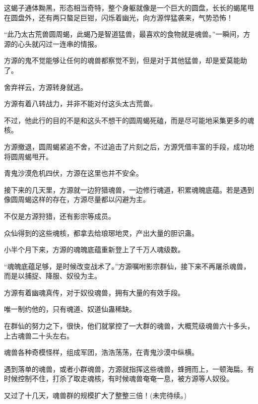 \begin{this_body}
这蝎子通体黝黑，形态相当奇特，整个身躯就像是一个巨大的圆盘，长长的蝎尾甩在圆盘外，还有两只螯足巨钳，闪烁着幽光，向方源悍猛袭来，气势恐怖！

“此乃太古荒兽圆周蝎，此蝎乃是智道猛兽，最喜欢的食物就是魂兽。”一瞬间，方源的心头就闪过一连串的情报。

方源的鬼不觉能够让任何的魂兽都察觉不到，但是对于其他猛兽，却是爱莫能助了。

舍弃祥云，方源转身就逃。

方源有着八转战力，并非不能对付这头太古荒兽。

不过，他此行的目的不是和这头不想干的圆周蝎死磕，而是尽可能地采集更多的魂核。

方源撤退，圆周蝎紧追不舍，不过追击了片刻之后，方源凭借丰富的手段，成功地将圆周蝎甩开。

青鬼沙漠危机四伏，方源在这里也并不安全。

接下来的几天里，方源就一边狩猎魂兽，一边修行魂道，积累魂魄底蕴。若是遇到像圆周蝎这样的存在，方源尽量都以闪避为主。

不仅是方源狩猎，还有影宗等成员。

众仙得到的这些魂核，都拿去给琅琊地灵，产出大量的胆识蛊。

小半个月下来，方源的魂魄底蕴重新登上了千万人魂级数。

“魂魄底蕴足够，是时候改变战术了。”方源嘱咐影宗群仙，接下来不再屠杀魂兽，而是以捕捉、降服、奴役为主。

方源有着幽魂真传，对于奴役魂兽，拥有大量的有效手段。

唯一制约他的，只有魂道、奴道仙蛊稀缺。

在群仙的努力之下，很快，他们就掌控了一大群的魂兽，大概荒级魂兽六十多头，上古魂兽二十头左右。

魂兽各种奇模怪样，组成军团，浩浩荡荡，在青鬼沙漠中纵横。

遇到落单的魂兽，或者小群魂兽，方源就指挥这些魂兽，蜂拥而上，一顿海扁。有时候控制不住，打杀了取走魂核，有时候魂兽奄奄一息，被方源等人奴役。

又过了十几天，魂兽群的规模扩大了整整三倍！(未完待续。)

\end{this_body}

